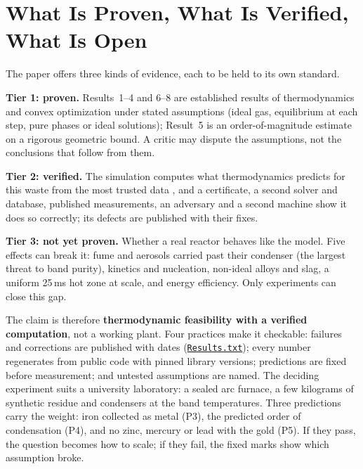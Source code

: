 \documentclass[11pt,a4paper]{article}
\newcommand{\gh}[2]{\href{https://github.com/syncaissa/paramanu-reclaimer/blob/main/#1}{\texttt{#2}}}
\theoremstyle{definition}
\theoremstyle{plain}
\theoremstyle{remark}
\begin{document}
\section{What Is Proven, What Is Verified, What Is Open}\label{sec:feasibility}

The paper offers three kinds of evidence, each to be held to its own standard.

\textbf{Tier 1: proven.} Results~1--4 and 6--8 are established results of thermodynamics and convex optimization under stated assumptions (ideal gas, equilibrium at each step, pure phases or ideal solutions); Result~5 is an order-of-magnitude estimate on a rigorous geometric bound. A critic may dispute the assumptions, not the conclusions that follow from them.

\textbf{Tier 2: verified.} The simulation computes what thermodynamics predicts for this waste from the most trusted data \citep{mcbride2002,chase1998}, and a certificate, a second solver and database, published measurements, an adversary and a second machine show it does so correctly; its defects are published with their fixes.

\textbf{Tier 3: not yet proven.} Whether a real reactor behaves like the model. Five effects can break it: fume and aerosols carried past their condenser (the largest threat to band purity), kinetics and nucleation, non-ideal alloys and slag, a uniform 25\,ms hot zone at scale, and energy efficiency. Only experiments can close this gap.

The claim is therefore \textbf{thermodynamic feasibility with a verified computation}, not a working plant. Four practices make it checkable: failures and corrections are published with dates (\gh{Results.txt}{Results.txt}); every number regenerates from public code with pinned library versions; predictions are fixed before measurement; and untested assumptions are named. The deciding experiment suits a university laboratory: a sealed arc furnace, a few kilograms of synthetic residue and condensers at the band temperatures. Three predictions carry the weight: iron collected as metal (P3), the predicted order of condensation (P4), and no zinc, mercury or lead with the gold (P5). If they pass, the question becomes how to scale; if they fail, the fixed marks show which assumption broke.
\end{document}
